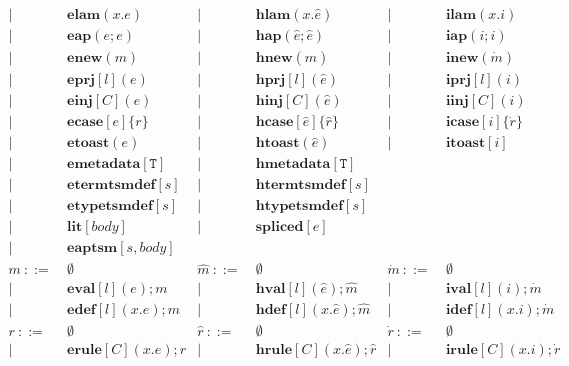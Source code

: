 \documentclass[letterpaper, notitlepage]{article}
\newcommand{\T}{\mathtt{T}}
\begin{document}
\[\begin{array}{rlrlrl}
				| ~ &~ \mathbf{elam}(x.e)     			& 		 	| ~ &~ 	\mathbf{hlam}(x.\hat{e})				& 		 	| ~ &~	\mathbf{ilam}(x.i)\\
				| ~ &~ \mathbf{eap}(e;e)     			& 		 	| ~ &~ 	\mathbf{hap}(\hat{e};\hat{e})			& 		 	| ~ &~	\mathbf{iap}(i;i)\\
				| ~ &~ \mathbf{enew}(m)     			& 		 	| ~ &~	\mathbf{hnew}(\hat{m})					& 		 	| ~ &~	\mathbf{inew}(\dot{m})\\
				| ~ &~ \mathbf{eprj}[l](e)     			& 		 	| ~ &~	\mathbf{hprj}[l](\hat{e})				& 		 	| ~ &~	\mathbf{iprj}[l](i)\\
				| ~ &~ \mathbf{einj}[C](e)     			& 		 	| ~ &~	\mathbf{hinj}[C](\hat{e})				& 		 	| ~ &~	\mathbf{iinj}[C](i)\\
				| ~ &~ \mathbf{ecase}[e]\{r\}     		& 		 	| ~ &~	\mathbf{hcase}[\hat{e}]\{\hat{r}\}		& 		 	| ~ &~	\mathbf{icase}[i]\{\dot{r}\}\\
				| ~ &~ \mathbf{etoast}(e)     			& 		 	| ~ &~	\mathbf{htoast}(\hat{e})				& 		 	| ~ &~	\mathbf{itoast}[i]\\
				| ~ &~ \mathbf{emetadata}[\T]     		& 		 	| ~ &~	\mathbf{hmetadata}[\T]\\
				| ~ &~ \mathbf{etermtsmdef}[s]     		&			| ~ &~ 	\mathbf{htermtsmdef}[s]\\
				| ~ &~ \mathbf{etypetsmdef}[s]			& 			| ~ &~ 	\mathbf{htypetsmdef}[s]\\
				| ~ &~ \mathbf{lit}[body]				& 		 	| ~ &~ 	\mathbf{spliced}[e]\\
				| ~ &~ \mathbf{eaptsm}[s,body]\\
	m 			~::=&~ \emptyset						&\hat{m}	~::=&~ \emptyset								&\dot{m}	~::=&~ \emptyset\\
				| ~ &~ \mathbf{eval}[l](e);m 			&			| ~ &~ \mathbf{hval}[l](\hat{e});\hat{m} 		&			| ~ &~ \mathbf{ival}[l](i);\dot{m}\\
				| ~ &~ \mathbf{edef}[l](x.e);m 			&			| ~ &~ \mathbf{hdef}[l](x.\hat{e});\hat{m}		&			| ~ &~ \mathbf{idef}[l](x.i);\dot{m}\\
	r 			~::=&~ \emptyset 						&\hat{r} 	~::=&~ \emptyset 								&\dot{r} 	~::=&~ \emptyset\\
				| ~ &~ \mathbf{erule}[C](x.e);r 		& 			| ~ &~ \mathbf{hrule}[C](x.\hat{e});\hat{r} 	&			| ~ &~ \mathbf{irule}[C](x.i);\dot{r}
\end{array}
\]
\end{document}
